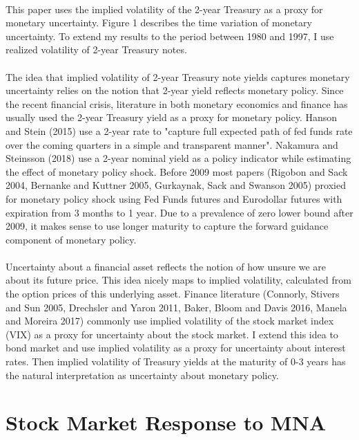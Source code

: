 \documentclass[12pt]{article}
\begin{document}
\paragraph{}
This paper uses the implied volatility of the 2-year Treasury as a proxy for monetary uncertainty. Figure 1 describes the time variation of monetary uncertainty. To extend my results to the period between 1980 and 1997, I use realized volatility of 2-year Treasury notes.
\paragraph{}
The idea that implied volatility of 2-year Treasury note yields captures monetary uncertainty relies on the notion that 2-year yield reflects monetary policy. Since the recent financial crisis, literature in both monetary economics and finance has usually used the 2-year Treasury yield as a proxy for monetary policy. Hanson and Stein (2015) use a 2-year rate to "capture full expected path of fed funds rate over the coming quarters in a simple and transparent manner". Nakamura and Steinsson (2018) use a 2-year nominal yield as a policy indicator while estimating the effect of monetary policy shock. Before 2009 most papers (Rigobon and Sack 2004, Bernanke and Kuttner 2005, Gurkaynak, Sack and Swanson 2005) proxied for monetary policy shock using Fed Funds futures and Eurodollar futures with expiration from 3 months to 1 year. Due to a prevalence of zero lower bound after 2009, it makes sense to use longer maturity to capture the forward guidance component of monetary policy.
\paragraph{}
Uncertainty about a financial asset reflects the notion of how unsure we are about its future price. This idea nicely maps to implied volatility, calculated from the option prices of this underlying asset. Finance literature (Connorly, Stivers and Sun 2005, Drechsler and Yaron 2011, Baker, Bloom and Davis 2016, Manela and Moreira 2017) commonly use implied volatility of the stock market index (VIX) as a proxy for uncertainty about the stock market. I extend this idea to bond market and use implied volatility as a proxy for uncertainty about interest rates. Then implied volatility of Treasury yields at the maturity of 0-3 years has the natural interpretation as uncertainty about monetary policy.

\section{Stock Market Response to MNA} \label{sec:Model}
\end{document}
